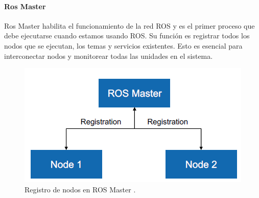             \paragraph{Ros Master}
                    Ros Master habilita el funcionamiento de la red ROS y es el primer proceso que debe ejecutarse cuando estamos usando ROS. Su función es registrar todos los nodos que se ejecutan, los temas y servicios existentes. Esto es esencial para interconectar nodos y monitorear todas las unidades en el sistema.
            \begin{figure}[htb]
                \centering
                \includegraphics[width=0.55\linewidth]{Main/Chapter3/Images3/n_s_a_6.png}
                \caption{Registro de nodos en ROS Master \cite{rosmaster_diagram}.}
                \label{f:Cap3_conceptos_6}
            \end{figure} 
            
            
               \newpage


